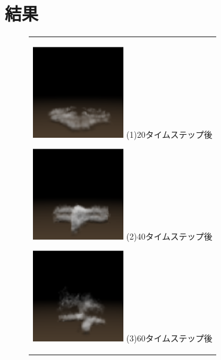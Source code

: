 \section{結果}

\begin{figure}[h]
  \begin{center}
    \begin{tabular}{c}

      \begin{minipage}{0.25\hsize}
        \begin{center}
          \includegraphics[clip, width=4cm]{./render_20.eps}
          \hspace{1.6cm} (1)20タイムステップ後
        \end{center}
      \end{minipage}

      \begin{minipage}{0.25\hsize}
        \begin{center}
          \includegraphics[clip, width=4cm]{./render_40.eps}
          \hspace{1.6cm} (2)40タイムステップ後
        \end{center}
      \end{minipage}

      \begin{minipage}{0.25\hsize}
        \begin{center}
          \includegraphics[clip, width=4cm]{./render_60.eps}
          \hspace{1.6cm} (3)60タイムステップ後
        \end{center}
      \end{minipage}


\end{tabular}
\end{center}
\end{figure}
